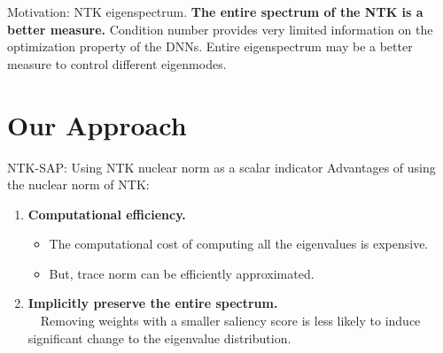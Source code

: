 \documentclass{beamer}
\begin{document}
\begin{frame}{Motivation: NTK eigenspectrum.}
    \textbf{The entire spectrum of the NTK is a better measure.} 
    Condition number provides very limited information on the optimization property of the DNNs. Entire eigenspectrum may be a better measure to control different eigenmodes.
\end{frame}

\section{Our Approach}

\begin{frame}{NTK-SAP: Using NTK nuclear norm as a scalar indicator}
    Advantages of using the nuclear norm of NTK: \\
    \begin{enumerate}
        \item \textbf{Computational efficiency.} 
        \begin{itemize}
            \item The computational cost of computing all the eigenvalues is expensive.
            \item But, trace norm can be efficiently approximated.
        \end{itemize} 
        \item \textbf{Implicitly preserve the entire spectrum.}  \\~\
        Removing weights with a smaller saliency score is less likely to induce significant change to the eigenvalue distribution.
    \end{enumerate}
    

    
\end{frame}
\end{document}
